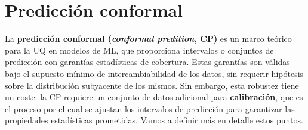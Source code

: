     

















\section{Predicción conformal}

La \textbf{predicción conformal (\textit{conformal predition}, CP)} \cite{vovk2005} es un marco teórico para 
la UQ en modelos de ML, que proporciona intervalos o conjuntos de predicción con garantías estadísticas de 
cobertura. Estas garantías son válidas bajo el supuesto mínimo de intercambiabilidad de los datos, sin 
requerir hipótesis sobre la distribución subyacente de los mismos.
Sin embargo, esta robustez tiene un coste: la CP requiere un conjunto de datos adicional para 
\textbf{calibración}, que es el proceso por el cual se ajustan los intervalos de predicción para garantizar 
las propiedades estadísticas prometidas.
Vamos a definir más en detalle estos puntos.

